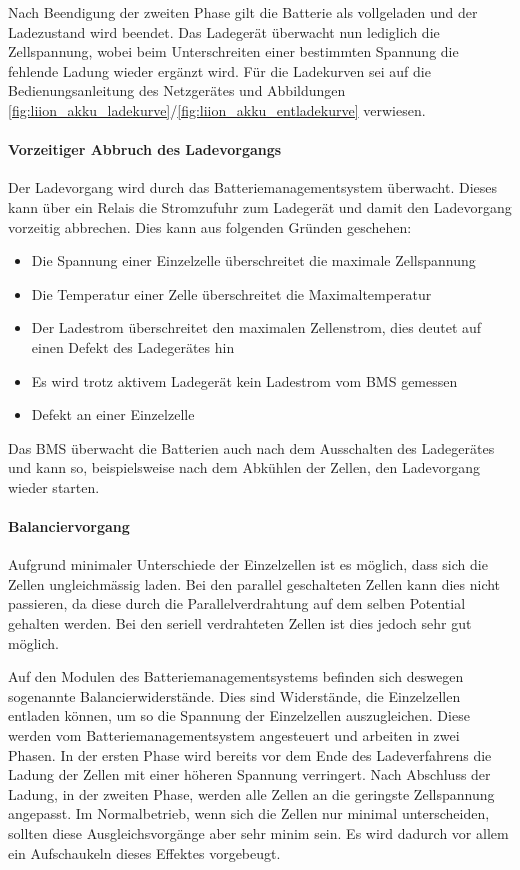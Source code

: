 Nach Beendigung der zweiten Phase gilt die Batterie als vollgeladen und der Ladezustand wird beendet. Das Ladegerät überwacht nun lediglich die Zellspannung, wobei beim Unterschreiten einer bestimmten Spannung die fehlende Ladung wieder ergänzt wird. Für die Ladekurven sei auf die Bedienungsanleitung des Netzgerätes \cite{ladegeraet} und Abbildungen \ref{fig:liion_akku_ladekurve}/\ref{fig:liion_akku_entladekurve} verwiesen.

\paragraph{Vorzeitiger Abbruch des Ladevorgangs}
Der Ladevorgang wird durch das Batteriemanagementsystem überwacht. Dieses kann über ein Relais die Stromzufuhr zum Ladegerät und damit den Ladevorgang vorzeitig abbrechen. Dies kann aus folgenden Gründen geschehen: \begin{itemize}
	\item Die Spannung einer Einzelzelle überschreitet die maximale Zellspannung
	\item Die Temperatur einer Zelle überschreitet die Maximaltemperatur
	\item Der Ladestrom überschreitet den maximalen Zellenstrom, dies deutet auf einen Defekt des Ladegerätes hin
	\item Es wird trotz aktivem Ladegerät kein Ladestrom vom BMS gemessen
	\item Defekt an einer Einzelzelle
\end{itemize}
Das BMS überwacht die Batterien auch nach dem Ausschalten des Ladegerätes und kann so, beispielsweise nach dem Abkühlen der Zellen, den Ladevorgang wieder starten.

\paragraph{Balanciervorgang}
Aufgrund minimaler Unterschiede der Einzelzellen ist es möglich, dass sich die Zellen ungleichmässig laden. Bei den parallel geschalteten Zellen kann dies nicht passieren, da diese durch die Parallelverdrahtung auf dem selben Potential gehalten werden. Bei den seriell verdrahteten Zellen ist dies jedoch sehr gut möglich.

Auf den Modulen des Batteriemanagementsystems befinden sich deswegen sogenannte Balancierwiderstände. Dies sind Widerstände, die Einzelzellen entladen können, um so die Spannung der Einzelzellen auszugleichen. Diese werden vom Batteriemanagementsystem angesteuert und arbeiten in zwei Phasen. In der ersten Phase wird bereits vor dem Ende des Ladeverfahrens die Ladung der Zellen mit einer höheren Spannung verringert. Nach Abschluss der Ladung, in der zweiten Phase, werden alle Zellen an die geringste Zellspannung angepasst. Im Normalbetrieb, wenn sich die Zellen nur minimal unterscheiden, sollten diese Ausgleichsvorgänge aber sehr minim sein. Es wird dadurch vor allem ein Aufschaukeln dieses Effektes vorgebeugt.